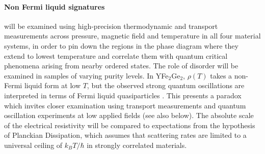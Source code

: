 


%

\paragraph{Non Fermi liquid signatures} will be examined using high-precision thermodynamic and transport measurements across pressure, magnetic field and temperature in all four material systems, in order to pin down the regions in the phase diagram where they extend to lowest temperature and correlate them with quantum critical phenomena arising from nearby ordered states. The role of disorder will be examined in samples of varying purity levels. %
In YFe$_2$Ge$_2$, $\rho(T)$ takes a non-Fermi liquid form at low $T$, but the observed strong quantum oscillations are interpreted in terms of Fermi liquid quasiparticles \cite{baglo21}. %
This presents a paradox which invites closer examination using transport measurements and quantum oscillation experiments at low applied fields (see also below).
The absolute scale of the electrical resistivity will be compared to expectations from the hypothesis of Planckian Dissipation, which assumes that scattering rates are limited to a universal ceiling of $k_B T/\hbar$ in strongly correlated materials.

